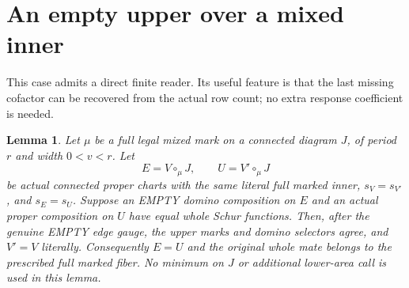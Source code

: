 \documentclass[11pt,a4paper]{amsart}
\numberwithin{equation}{section}
\theoremstyle{plain}
\newtheorem{lemma}[theorem]{Lemma}
\theoremstyle{definition}
\begin{document}
\section{An empty upper over a mixed inner}\label{app:mixed-empty}
\label{rt:mixed-empty-section}

This case admits a direct finite reader.  Its useful feature is that
the last missing cofactor can be recovered from the actual row count;
no extra response coefficient is needed.

\begin{lemma}
\label{rt:mixed-empty}
Let \(\mu\) be a full legal mixed mark on a connected diagram \(J\),
of period \(r\) and width \(0<v<r\).  Let
\[
 E=V\circ_\mu J,\qquad U=V'\circ_\mu J
\]
be actual connected proper charts with the same literal full marked
inner, \(s_V=s_{V'}\), and \(s_E=s_U\).  Suppose an EMPTY domino
composition on \(E\) and an actual proper composition on \(U\) have equal
whole Schur functions.  Then, after the genuine EMPTY edge gauge,
the upper marks and domino selectors agree, and \(V'=V\) literally.
Consequently \(E=U\) and the original whole mate belongs to the prescribed
full marked fiber.  No minimum on \(J\) or additional lower-area call is
used in this lemma.
\end{lemma}
\end{document}
